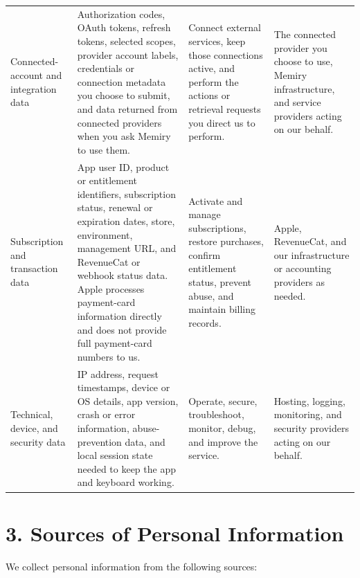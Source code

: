 \documentclass[11pt]{article}
\begin{document}
\begin{longtable}{L{0.19\textwidth} L{0.28\textwidth} L{0.25\textwidth} L{0.2\textwidth}}
Connected-account and integration data &
Authorization codes, OAuth tokens, refresh tokens, selected scopes, provider account labels, credentials or connection metadata you choose to submit, and data returned from connected providers when you ask Memiry to use them. &
Connect external services, keep those connections active, and perform the actions or retrieval requests you direct us to perform. &
The connected provider you choose to use, Memiry infrastructure, and service providers acting on our behalf. \\

Subscription and transaction data &
App user ID, product or entitlement identifiers, subscription status, renewal or expiration dates, store, environment, management URL, and RevenueCat or webhook status data. Apple processes payment-card information directly and does not provide full payment-card numbers to us. &
Activate and manage subscriptions, restore purchases, confirm entitlement status, prevent abuse, and maintain billing records. &
Apple, RevenueCat, and our infrastructure or accounting providers as needed. \\

Technical, device, and security data &
IP address, request timestamps, device or OS details, app version, crash or error information, abuse-prevention data, and local session state needed to keep the app and keyboard working. &
Operate, secure, troubleshoot, monitor, debug, and improve the service. &
Hosting, logging, monitoring, and security providers acting on our behalf. \\
\end{longtable}
\normalsize

\section*{3. Sources of Personal Information}

We collect personal information from the following sources:
\end{document}

